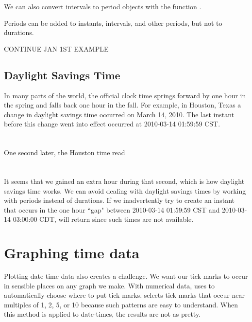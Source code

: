 \documentclass[article]{jss}
\begin{document}
We can also convert intervals to period objects with the function .



Periods can be added to instants, intervals, and other periods, but not to durations.

CONTINUE JAN 1ST EXAMPLE


\subsection{Daylight Savings Time}
\label{sec:DST}

In many parts of the world, the official clock time springs forward by one hour in the spring and falls back one hour in the fall. For example, in Houston, Texas a change in daylight savings time occurred on March 14, 2010. The last instant before this change went into effect occurred at 2010-03-14 01:59:59 CST.\\

\\
\\

One second later, the Houston time read\\

\\
\\

It seems that we gained an extra hour during that second, which is how daylight savings time works. We can avoid dealing with daylight savings times by working with periods instead of durations. If we inadvertently try to create an instant that occurs in the one hour ``gap" between 2010-03-14 01:59:59 CST  and 2010-03-14 03:00:00 CDT,  will return  since such times are not available.

\section{Graphing time data}
\label{sec:utils}

Plotting date-time data also creates a challenge. We want our tick marks to occur in sensible places on any graph we make. With numerical data,  uses  to automatically choose where to put tick marks.  selects tick marks that occur near multiples of 1, 2, 5, or 10 because such patterns are easy to understand. When this method is applied to date-times, the results are not as pretty.\\
\end{document}
